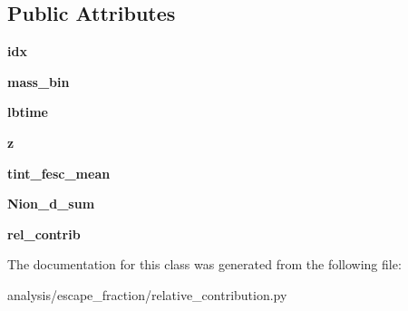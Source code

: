 \subsection*{Public Attributes}
\begin{DoxyCompactItemize}
\item 
\hypertarget{classseren3_1_1analysis_1_1escape__fraction_1_1relative__contribution_1_1MassBin_a6dc60d11500b67b74eb87584e3e2428e}{
{\bfseries idx}}
\label{classseren3_1_1analysis_1_1escape__fraction_1_1relative__contribution_1_1MassBin_a6dc60d11500b67b74eb87584e3e2428e}

\item 
\hypertarget{classseren3_1_1analysis_1_1escape__fraction_1_1relative__contribution_1_1MassBin_a8ef5287685df443eca8d5f109c4aa8de}{
{\bfseries mass\_\-bin}}
\label{classseren3_1_1analysis_1_1escape__fraction_1_1relative__contribution_1_1MassBin_a8ef5287685df443eca8d5f109c4aa8de}

\item 
\hypertarget{classseren3_1_1analysis_1_1escape__fraction_1_1relative__contribution_1_1MassBin_a566669d6fb2920db142cc081e1e8f0b5}{
{\bfseries lbtime}}
\label{classseren3_1_1analysis_1_1escape__fraction_1_1relative__contribution_1_1MassBin_a566669d6fb2920db142cc081e1e8f0b5}

\item 
\hypertarget{classseren3_1_1analysis_1_1escape__fraction_1_1relative__contribution_1_1MassBin_a42f3d3a350597fb7c5b17d63e5b29a6a}{
{\bfseries z}}
\label{classseren3_1_1analysis_1_1escape__fraction_1_1relative__contribution_1_1MassBin_a42f3d3a350597fb7c5b17d63e5b29a6a}

\item 
\hypertarget{classseren3_1_1analysis_1_1escape__fraction_1_1relative__contribution_1_1MassBin_a5fcd29808ed2b9faa0f57104870b02ac}{
{\bfseries tint\_\-fesc\_\-mean}}
\label{classseren3_1_1analysis_1_1escape__fraction_1_1relative__contribution_1_1MassBin_a5fcd29808ed2b9faa0f57104870b02ac}

\item 
\hypertarget{classseren3_1_1analysis_1_1escape__fraction_1_1relative__contribution_1_1MassBin_a1b6383dc39ea021fdbb941c77203166e}{
{\bfseries Nion\_\-d\_\-sum}}
\label{classseren3_1_1analysis_1_1escape__fraction_1_1relative__contribution_1_1MassBin_a1b6383dc39ea021fdbb941c77203166e}

\item 
\hypertarget{classseren3_1_1analysis_1_1escape__fraction_1_1relative__contribution_1_1MassBin_ac02e8d84ce137635a66734c880b8d9c0}{
{\bfseries rel\_\-contrib}}
\label{classseren3_1_1analysis_1_1escape__fraction_1_1relative__contribution_1_1MassBin_ac02e8d84ce137635a66734c880b8d9c0}

\end{DoxyCompactItemize}


The documentation for this class was generated from the following file:\begin{DoxyCompactItemize}
\item 
analysis/escape\_\-fraction/relative\_\-contribution.py\end{DoxyCompactItemize}
